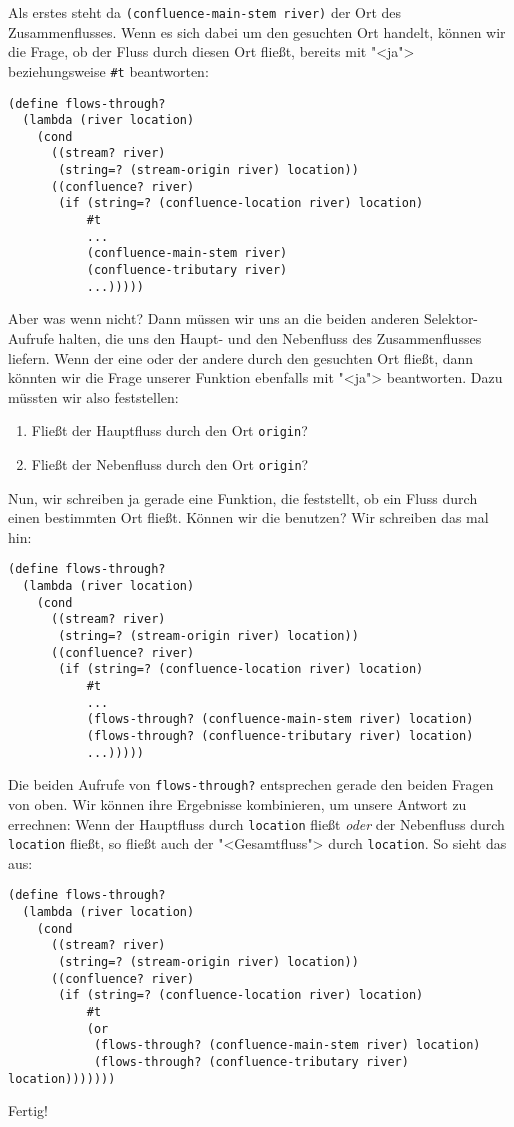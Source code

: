 Als erstes steht da \lstinline{(confluence-main-stem river)} der Ort
des Zusammenflusses.  Wenn es sich dabei um den gesuchten Ort handelt,
können wir die Frage, ob der Fluss durch diesen Ort fließt, bereits
mit "<ja"> beziehungsweise \lstinline{#t} beantworten:
%
\begin{lstlisting}
(define flows-through?
  (lambda (river location)
    (cond
      ((stream? river)
       (string=? (stream-origin river) location))
      ((confluence? river)
       (if (string=? (confluence-location river) location)
           #t
           ...
           (confluence-main-stem river)
           (confluence-tributary river)
           ...)))))
\end{lstlisting}
%
Aber was wenn nicht?  Dann müssen wir uns an die beiden anderen
Selektor-Aufrufe halten, die uns den Haupt- und den Nebenfluss des
Zusammenflusses liefern.  Wenn der eine oder der andere durch den
gesuchten Ort fließt, dann könnten wir die Frage unserer Funktion
ebenfalls mit "<ja"> beantworten.  Dazu müssten wir also feststellen:
%
\begin{enumerate}
\item Fließt der Hauptfluss durch den Ort \lstinline{origin}?
\item Fließt der Nebenfluss durch den Ort \lstinline{origin}?
\end{enumerate}
%
Nun, wir schreiben ja gerade eine Funktion, die feststellt, ob ein
Fluss durch einen bestimmten Ort fließt.  Können wir die benutzen?
Wir schreiben das mal hin:
%
\begin{lstlisting}
(define flows-through?
  (lambda (river location)
    (cond
      ((stream? river)
       (string=? (stream-origin river) location))
      ((confluence? river)
       (if (string=? (confluence-location river) location)
           #t
           ...
           (flows-through? (confluence-main-stem river) location)
           (flows-through? (confluence-tributary river) location)
           ...)))))
\end{lstlisting}
%
Die beiden Aufrufe von \lstinline{flows-through?} entsprechen gerade
den beiden Fragen von oben.  Wir können ihre Ergebnisse kombinieren,
um unsere Antwort zu errechnen: Wenn der Hauptfluss durch
\lstinline{location} fließt \emph{oder} der Nebenfluss durch
\lstinline{location} fließt, so fließt auch der "<Gesamtfluss"> durch
\lstinline{location}.  So sieht das aus:
%
\begin{lstlisting}
(define flows-through?
  (lambda (river location)
    (cond
      ((stream? river)
       (string=? (stream-origin river) location))
      ((confluence? river)
       (if (string=? (confluence-location river) location)
           #t
           (or
            (flows-through? (confluence-main-stem river) location)
            (flows-through? (confluence-tributary river) location)))))))
\end{lstlisting}
%
Fertig!

